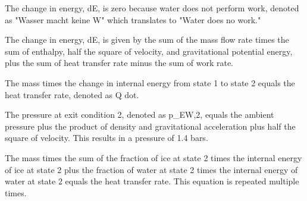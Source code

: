 The change in energy, dE, is zero because water does not perform work, denoted as "Wasser macht keine W" which translates to "Water does no work."

The change in energy, dE, is given by the sum of the mass flow rate times the sum of enthalpy, half the square of velocity, and gravitational potential energy, plus the sum of heat transfer rate minus the sum of work rate.

The mass times the change in internal energy from state 1 to state 2 equals the heat transfer rate, denoted as Q dot.

The pressure at exit condition 2, denoted as p_EW,2, equals the ambient pressure plus the product of density and gravitational acceleration plus half the square of velocity. This results in a pressure of 1.4 bars.

The mass times the sum of the fraction of ice at state 2 times the internal energy of ice at state 2 plus the fraction of water at state 2 times the internal energy of water at state 2 equals the heat transfer rate. This equation is repeated multiple times.